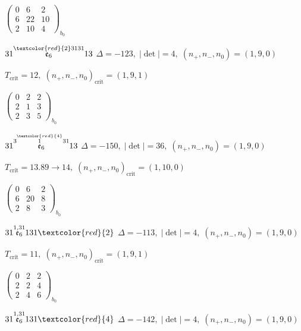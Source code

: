 \documentclass[10pt]{article}
\begin{document}
\hspace{2em}$\left(\begin{smallmatrix}0 & 6 & 2 \\ 6 & 22 & 10 \\ 2 & 10 & 4\end{smallmatrix}\right)_{\!b_0}$

$31\overset{\textcolor{red}{2}3131}{\mathfrak{e}_6}13$ \quad $\Delta=-123,\; |\det|=4,\; (n_+,n_-,n_0)=(1,9,0)$

\hspace{1em}$T_{\text{crit}}=12,\; (n_+,n_-,n_0)_{\text{crit}}=(1,9,1)$

\hspace{2em}$\left(\begin{smallmatrix}0 & 2 & 2 \\ 2 & 1 & 3 \\ 2 & 3 & 5\end{smallmatrix}\right)_{\!b_0}$

$31\overset{3\overset{\textcolor{red}{4}}{1}31}{\mathfrak{e}_6}13$ \quad $\Delta=-150,\; |\det|=36,\; (n_+,n_-,n_0)=(1,9,0)$

\hspace{1em}$T_{\text{crit}}=13.89 \to 14,\; (n_+,n_-,n_0)_{\text{crit}}=(1,10,0)$

\hspace{2em}$\left(\begin{smallmatrix}0 & 6 & 2 \\ 6 & 20 & 8 \\ 2 & 8 & 3\end{smallmatrix}\right)_{\!b_0}$

\smallskip

$31\overset{1,31}{\mathfrak{e}_6}131\textcolor{red}{2}$ \quad $\Delta=-113,\; |\det|=4,\; (n_+,n_-,n_0)=(1,9,0)$

\hspace{1em}$T_{\text{crit}}=11,\; (n_+,n_-,n_0)_{\text{crit}}=(1,9,1)$

\hspace{2em}$\left(\begin{smallmatrix}0 & 2 & 2 \\ 2 & 2 & 4 \\ 2 & 4 & 6\end{smallmatrix}\right)_{\!b_0}$

$31\overset{1,31}{\mathfrak{e}_6}131\textcolor{red}{4}$ \quad $\Delta=-142,\; |\det|=4,\; (n_+,n_-,n_0)=(1,9,0)$
\end{document}
